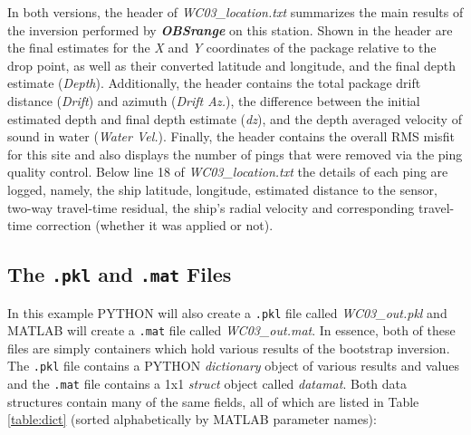 \documentclass[titlepage, 12pt]{article}
\begin{document}
  In both versions, the header of \textit{WC03\_location.txt} summarizes the main results of the inversion performed by \textbf{\textit{OBSrange}} on this station. Shown in the header are the final estimates for the \textit{X} and \textit{Y} coordinates of the package relative to the drop point, as well as their converted latitude and longitude, and the final depth estimate (\textit{Depth}). Additionally, the header contains the total package drift distance (\textit{Drift}) and azimuth (\textit{Drift Az.}), the difference between the initial estimated depth and final depth estimate (\textit{dz}), and the depth averaged velocity of sound in water (\textit{Water Vel.}). Finally, the header contains the overall RMS misfit for this site and also displays the number of pings that were removed via the ping quality control. Below line 18 of \textit{WC03\_location.txt} the details of each ping are logged, namely, the ship latitude, longitude, estimated distance to the sensor, two-way travel-time residual, the ship's radial velocity and corresponding travel-time correction (whether it was applied or not).
 
  \subsection{The \texttt{.pkl} and \texttt{.mat} Files}
  In this example PYTHON will also create a \texttt{.pkl} file called \textit{WC03\_out.pkl} and MATLAB will create a \texttt{.mat} file called \textit{WC03\_out.mat}. In essence, both of these files are simply containers which hold various results of the bootstrap inversion. The \texttt{.pkl} file contains a PYTHON \textit{dictionary} object of various results and values and the \texttt{.mat} file contains a 1x1 \textit{struct} object called \textit{datamat}. Both data structures contain many of the same fields, all of which are listed in Table \ref{table:dict} (sorted alphabetically by MATLAB parameter names):
\end{document}
